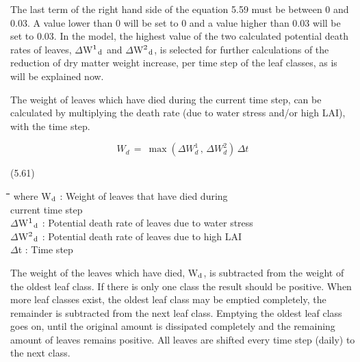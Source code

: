 \documentclass[11pt]{article}
\begin{document}
\bigskip
\bigskip
The last term of the right hand side of the equation 5.59 must be between 0 and 0.03. A 
value lower than 0 will be set to 0 and a value higher than 0.03 will be set to 0.03. In the
model, the highest value of the two calculated potential death rates of leaves, $\Delta$W$^{{\rm 1}}$$_{{\rm d}}$ and
$\Delta$W$^{{\rm 2}}$$_{{\rm d}}$, is selected for further calculations of the reduction of dry matter weight increase,
per time step of the leaf classes, as is will be explained now. 

\bigskip
\bigskip
The weight of leaves which have died during the current time step, can be calculated by
multiplying the death rate (due to water stress and/or high LAI), with the time step.

\begin{displaymath}
W _{d~} =~ \max (\Delta W _{d}^{1} \, ,\,\Delta W _{d}^{2} )\,\Delta t
\end{displaymath}

 \bigskip
\strut\hfill (5.61)
\nwln
\begin{tabbing}
\hspace{1.27cm}\=\hspace{1.27cm}\=\hspace{1.27cm}\=\hspace{1.27cm}\=%
\hspace{1.27cm}\=\hspace{1.27cm}\=\hspace{1.27cm}\=\hspace{1.27cm}\=%
\hspace{1.27cm}\=\hspace{1.27cm}\=\kill
where\> W$_{{\rm d}}$\> : Weight of leaves that have died during \\
\>\>   current time step\> \> \> \> \> \> \> \> [kg ha$^{{\rm -1}}$]\\
\>$\Delta$W$^{{\rm 1}}$$_{{\rm d}}$\> : Potential death rate of leaves due to water stress \> \> \> \> \> \> \> \> [kg ha$^{{\rm -1}}$ d$^{{\rm -1}}$]\\
\>$\Delta$W$^{{\rm 2}}$$_{{\rm d}}$\> : Potential death rate of leaves due to high LAI\> \> \> \> \> \> \> \> [kg ha$^{{\rm -1}}$ d$^{{\rm -1}}$]\\
\>$\Delta$t\> : Time step\> \> \> \> \> \> \> \> [d]
\end{tabbing}

 \bigskip
The weight of the leaves which have died, W$_{{\rm d}}$, is subtracted from the weight of the oldest
leaf class. If there is only one class the result should be positive. When more leaf classes
exist, the oldest leaf class may be emptied completely, the remainder is subtracted from
the next leaf class. Emptying the oldest leaf class goes on, until the original amount is
dissipated complete\-ly and the remaining amount of leaves remains positive. All leaves are
shifted every time step (daily) to the next class.
\end{document}
